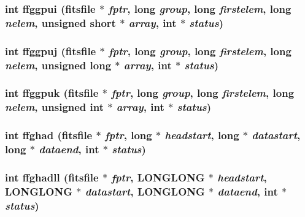 \subsubsection{\setlength{\rightskip}{0pt plus 5cm}int ffggpui (\bf{fitsfile} $\ast$ {\em fptr}, long {\em group}, long {\em firstelem}, long {\em nelem}, unsigned short $\ast$ {\em array}, int $\ast$ {\em status})}\label{fitsio_8h_34d6ece27ce372694fbd813123a5e5be}


\subsubsection{\setlength{\rightskip}{0pt plus 5cm}int ffggpuj (\bf{fitsfile} $\ast$ {\em fptr}, long {\em group}, long {\em firstelem}, long {\em nelem}, unsigned long $\ast$ {\em array}, int $\ast$ {\em status})}\label{fitsio_8h_895a8758518346c4e79ba31731f2a726}


\subsubsection{\setlength{\rightskip}{0pt plus 5cm}int ffggpuk (\bf{fitsfile} $\ast$ {\em fptr}, long {\em group}, long {\em firstelem}, long {\em nelem}, unsigned int $\ast$ {\em array}, int $\ast$ {\em status})}\label{fitsio_8h_2903d7086c8c109b98b9626067b45c11}


\subsubsection{\setlength{\rightskip}{0pt plus 5cm}int ffghad (\bf{fitsfile} $\ast$ {\em fptr}, long $\ast$ {\em headstart}, long $\ast$ {\em datastart}, long $\ast$ {\em dataend}, int $\ast$ {\em status})}\label{fitsio_8h_e1b924d5db7f75a39e445055e1bb12cc}


\subsubsection{\setlength{\rightskip}{0pt plus 5cm}int ffghadll (\bf{fitsfile} $\ast$ {\em fptr}, \bf{LONGLONG} $\ast$ {\em headstart}, \bf{LONGLONG} $\ast$ {\em datastart}, \bf{LONGLONG} $\ast$ {\em dataend}, int $\ast$ {\em status})}\label{fitsio_8h_d9af6a189f3d9ea5cab7da778ed4cdd2}


